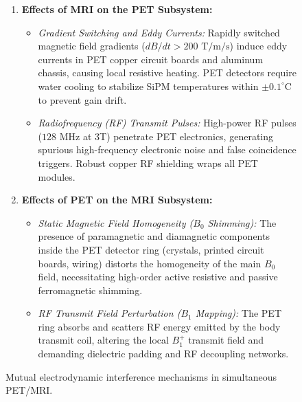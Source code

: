 \documentclass[11pt,a4paper]{article}
\begin{document}
\begin{figure}[htbp]
\centering
\begin{tcolorbox}[colback=purple!5!white,colframe=purple!60!black,title=\textbf{Electrodynamic Interactions in Simultaneous PET/MRI Systems},width=\linewidth]
\small
\begin{enumerate}[leftmargin=1.5em]
    \item \textbf{Effects of MRI on the PET Subsystem:}
    \begin{itemize}
        \item \textit{Gradient Switching and Eddy Currents:} Rapidly switched magnetic field gradients ($dB/dt > 200\text{ T/m/s}$) induce eddy currents in PET copper circuit boards and aluminum chassis, causing local resistive heating. PET detectors require water cooling to stabilize SiPM temperatures within $\pm 0.1^\circ\text{C}$ to prevent gain drift.
        \item \textit{Radiofrequency (RF) Transmit Pulses:} High-power RF pulses ($128\text{ MHz}$ at 3T) penetrate PET electronics, generating spurious high-frequency electronic noise and false coincidence triggers. Robust copper RF shielding wraps all PET modules.
    \end{itemize}
    \item \textbf{Effects of PET on the MRI Subsystem:}
    \begin{itemize}
        \item \textit{Static Magnetic Field Homogeneity ($B_0$ Shimming):} The presence of paramagnetic and diamagnetic components inside the PET detector ring (crystals, printed circuit boards, wiring) distorts the homogeneity of the main $B_0$ field, necessitating high-order active resistive and passive ferromagnetic shimming.
        \item \textit{RF Transmit Field Perturbation ($B_1$ Mapping):} The PET ring absorbs and scatters RF energy emitted by the body transmit coil, altering the local $B_1^+$ transmit field and demanding dielectric padding and RF decoupling networks.
    \end{itemize}
\end{enumerate}
\end{tcolorbox}
\caption{Mutual electrodynamic interference mechanisms in simultaneous PET/MRI.}
\label{fig:pet_mri_interference}
\end{figure}
\end{document}
